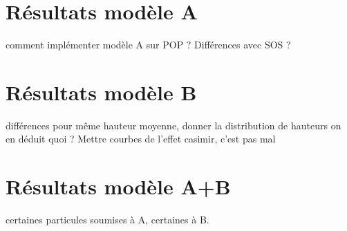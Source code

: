	\section{Résultats modèle A}
	comment implémenter modèle A sur POP ? Différences avec SOS ?
	\section{Résultats modèle B}
	différences pour même hauteur moyenne, donner la distribution de hauteurs 
	on en déduit quoi ? 
	Mettre courbes de l'effet casimir, c'est pas mal
	\section{Résultats modèle A+B}
		certaines particules soumises à A, certaines à B. 